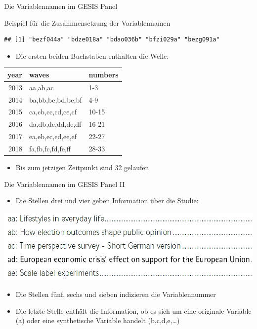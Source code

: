 \documentclass[ignorenonframetext,]{beamer}
\providecommand{\tightlist}{%
  \setlength{\itemsep}{0pt}\setlength{\parskip}{0pt}}
\begin{document}
\begin{frame}[fragile]{Die Variablennamen im GESIS Panel}

\begin{block}{Beispiel für die Zusammensetzung der Variablennamen}

\begin{verbatim}
## [1] "bezf044a" "bdze018a" "bdao036b" "bfzi029a" "bezg091a"
\end{verbatim}

\begin{itemize}
\tightlist
\item
  Die ersten beiden Buchstaben enthalten die Welle:
\end{itemize}

\begin{tabular}{r|l|l}
\hline
year & waves & numbers\\
\hline
2013 & aa,ab,ac & 1-3\\
\hline
2014 & ba,bb,bc,bd,be,bf & 4-9\\
\hline
2015 & ca,cb,cc,cd,ce,cf & 10-15\\
\hline
2016 & da,db,dc,dd,de,df & 16-21\\
\hline
2017 & ea,eb,ec,ed,ee,ef & 22-27\\
\hline
2018 & fa,fb,fc,fd,fe,ff & 28-33\\
\hline
\end{tabular}

\begin{itemize}
\tightlist
\item
  Bis zum jetzigen Zeitpunkt sind 32 gelaufen
\end{itemize}

\end{block}

\end{frame}

\begin{frame}{Die Variablennamen im GESIS Panel II}

\begin{itemize}
\tightlist
\item
  Die Stellen drei und vier geben Information über die Studie:
\end{itemize}

\includegraphics{figure/examplestudies.PNG}

\begin{itemize}
\item
  Die Stellen fünf, sechs und sieben indizieren die Variablennummer
\item
  Die letzte Stelle enthält die Information, ob es sich um eine
  originale Variable (a) oder eine synthetische Variable handelt
  (b,c,d,e,\ldots{})
\end{itemize}

\end{frame}
\end{document}
